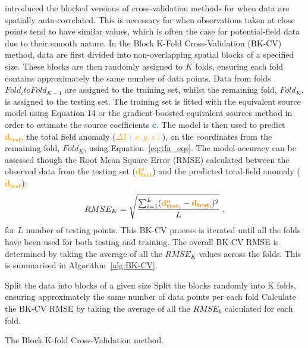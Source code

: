 \citet{Roberts2017} introduced the blocked versions of cross-validation methods for when data are spatially auto-correlated. This is necessary for when observations taken at close points tend to have similar values, which is often the case for potential-field data due to their smooth nature. In the Block K-Fold Cross-Validation (BK-CV) method, data are first divided into non-overlapping spatial blocks of a specified size. These blocks are then randomly assigned to $K$ folds, ensuring each fold contains approximately the same number of data points. Data from folds $Fold_i to Fold_{K-1}$ are assigned to the training set, whilst the remaining fold, $Fold_K$, is assigned to the testing set. The training set is fitted with the equivalent source model using Equation 14 or the gradient-boosted equivalent sources method in order to estimate the source coefficients \textcolor{teal}{$\bar{\mathbf{c}}$}. The model is then used to predict \textcolor{orange}{$\mathbf{d_{test}}$}, the total field anomaly (\textcolor{orange}{$\Delta T (x, y, z)$}), on the coordinates from the remaining fold, $Fold_K$, using Equation~\ref{eq:tfa_eqs}. The model accuracy can be assessed though the Root Mean Square Error (RMSE) calculated between the observed data from the testing set (\textcolor{orange}{$\mathbf{d^o_{test}}$}) and the predicted total-field anomaly (\textcolor{orange}{$\mathbf{d_{test}}$}):
\begin{equation}
    \label{eq:rmse}
    RMSE_K = \sqrt{\frac{\sum_{i=1}^L (\textcolor{orange}{\mathbf{d^o_{test_i}}} - \textcolor{orange}{\mathbf{d_{test_i}}})^2}{L}}
    \ ,
\end{equation}
 for $L$ number of testing points. This BK-CV process is iterated until all the folds have been used for both testing and training. The overall BK-CV RMSE is determined by taking the average of all the $RMSE_K$ values across the folds. This is summarised in Algorithm~\ref{alg:BK-CV}.


\begin{algorithm}[!h]
    Split the data into blocks of a given size
    \;
    Split the blocks randomly into K folds, ensuring approximately the same number of data points per each fold
    \;
    Calculate the BK-CV RMSE by taking the average of all the $RMSE_k$ calculated for each fold.
    \BlankLine
    \caption{The Block K-fold Cross-Validation method.}
    \label{alg:BK-CV}
\end{algorithm}


